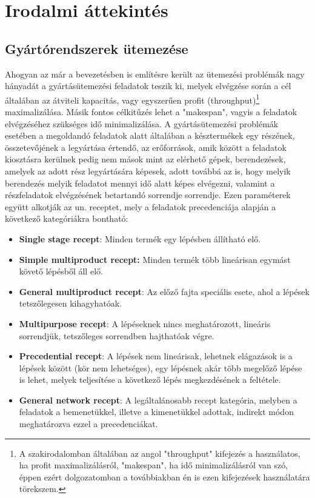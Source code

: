 \chapter{Irodalmi áttekintés} \label{Research}     
\section{Gyártórendszerek ütemezése}
Ahogyan az már a bevezetésben is említésre került az ütemezési problémák nagy hányadát a gyártásütemezési feladatok teszik ki, melyek elvégzése során a cél általában az átviteli kapacitás, vagy egyszerűen profit (throughput)\footnote{A szakirodalomban általában az angol "throughput" kifejezés a használatos, ha profit maximalizálásról, "makespan", ha idő minimalizálásról van szó, éppen ezért dolgozatomban a továbbiakban én is ezen kifejezések használatára törekszem.} maximalizálása.
Másik fontos célkitűzés lehet a "makespan", vagyis a feladatok elvégzéséhez szükséges idő minimalizálása.
A gyártásütemezési problémák esetében a megoldandó feladatok alatt általában a késztermékek egy részének, összetevőjének a legyártása értendő, az erőforrások, amik között a feladatok kiosztásra kerülnek pedig nem mások mint az elérhető gépek, berendezések, amelyek az adott rész legyártására képesek, adott továbbá az is, hogy melyik berendezés melyik feladatot mennyi idő alatt képes elvégezni, valamint a részfeladatok elvégzésének betartandó sorrendje sorrendje.
Ezen paraméterek együtt alkotják az un. receptet, mely a feladatok precedenciája alapján a következő kategóriákra bontható:
\begin{itemize}
\item[]\textbf{Single stage recept}: Minden termék egy lépésben állítható elő. 
\item[]\textbf{Simple multiproduct recept:} Minden termék több lineárisan egymást követő lépésből áll elő.
\item[]\textbf{General multiproduct recept}: Az előző fajta speciális esete, ahol a lépések tetszőlegesen kihagyhatóak.
\item[]\textbf{Multipurpose recept}: A lépéseknek nincs meghatározott, lineáris sorrendjük, tetszőleges sorrendben hajthatóak végre.
\item[]\textbf{Precedential recept}: A lépések nem lineárisak, lehetnek elágazások is a lépések között (kör nem lehetséges), egy lépésnek akár több megelőző lépése is lehet, melyek teljesítése a következő lépés megkezdésének a feltétele.
\item[]\textbf{General network recept}: A legáltalánosabb recept kategória, melyben a feladatok a bemenetükkel, illetve a kimenetükkel adottak, indirekt módon meghatározva ezzel a precedenciákat.\cite{hegyhati2010} 
\end{itemize}

